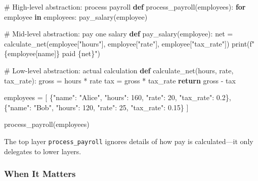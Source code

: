 \documentclass[
  letterpaper,
  DIV=11,
  numbers=noendperiod]{scrreprt}
\newenvironment{Shaded}{\begin{snugshade}}{\end{snugshade}}
\newcommand{\BuiltInTok}[1]{\textcolor[rgb]{0.00,0.23,0.31}{#1}}
\newcommand{\CommentTok}[1]{\textcolor[rgb]{0.37,0.37,0.37}{#1}}
\newcommand{\ControlFlowTok}[1]{\textcolor[rgb]{0.00,0.23,0.31}{\textbf{#1}}}
\newcommand{\DecValTok}[1]{\textcolor[rgb]{0.68,0.00,0.00}{#1}}
\newcommand{\FloatTok}[1]{\textcolor[rgb]{0.68,0.00,0.00}{#1}}
\newcommand{\KeywordTok}[1]{\textcolor[rgb]{0.00,0.23,0.31}{\textbf{#1}}}
\newcommand{\NormalTok}[1]{\textcolor[rgb]{0.00,0.23,0.31}{#1}}
\newcommand{\OperatorTok}[1]{\textcolor[rgb]{0.37,0.37,0.37}{#1}}
\newcommand{\SpecialCharTok}[1]{\textcolor[rgb]{0.37,0.37,0.37}{#1}}
\newcommand{\SpecialStringTok}[1]{\textcolor[rgb]{0.13,0.47,0.30}{#1}}
\newcommand{\StringTok}[1]{\textcolor[rgb]{0.13,0.47,0.30}{#1}}
\begin{document}
\begin{Shaded}
\begin{Highlighting}[]
\CommentTok{\# High{-}level abstraction: process payroll}
\KeywordTok{def}\NormalTok{ process\_payroll(employees):}
    \ControlFlowTok{for}\NormalTok{ employee }\KeywordTok{in}\NormalTok{ employees:}
\NormalTok{        pay\_salary(employee)}

\CommentTok{\# Mid{-}level abstraction: pay one salary}
\KeywordTok{def}\NormalTok{ pay\_salary(employee):}
\NormalTok{    net }\OperatorTok{=}\NormalTok{ calculate\_net(employee[}\StringTok{"hours"}\NormalTok{], employee[}\StringTok{"rate"}\NormalTok{], employee[}\StringTok{"tax\_rate"}\NormalTok{])}
    \BuiltInTok{print}\NormalTok{(}\SpecialStringTok{f"}\SpecialCharTok{\{}\NormalTok{employee[}\StringTok{\textquotesingle{}name\textquotesingle{}}\NormalTok{]}\SpecialCharTok{\}}\SpecialStringTok{ paid }\SpecialCharTok{\{}\NormalTok{net}\SpecialCharTok{\}}\SpecialStringTok{"}\NormalTok{)}

\CommentTok{\# Low{-}level abstraction: actual calculation}
\KeywordTok{def}\NormalTok{ calculate\_net(hours, rate, tax\_rate):}
\NormalTok{    gross }\OperatorTok{=}\NormalTok{ hours }\OperatorTok{*}\NormalTok{ rate}
\NormalTok{    tax }\OperatorTok{=}\NormalTok{ gross }\OperatorTok{*}\NormalTok{ tax\_rate}
    \ControlFlowTok{return}\NormalTok{ gross }\OperatorTok{{-}}\NormalTok{ tax}

\NormalTok{employees }\OperatorTok{=}\NormalTok{ [}
\NormalTok{    \{}\StringTok{"name"}\NormalTok{: }\StringTok{"Alice"}\NormalTok{, }\StringTok{"hours"}\NormalTok{: }\DecValTok{160}\NormalTok{, }\StringTok{"rate"}\NormalTok{: }\DecValTok{20}\NormalTok{, }\StringTok{"tax\_rate"}\NormalTok{: }\FloatTok{0.2}\NormalTok{\},}
\NormalTok{    \{}\StringTok{"name"}\NormalTok{: }\StringTok{"Bob"}\NormalTok{, }\StringTok{"hours"}\NormalTok{: }\DecValTok{120}\NormalTok{, }\StringTok{"rate"}\NormalTok{: }\DecValTok{25}\NormalTok{, }\StringTok{"tax\_rate"}\NormalTok{: }\FloatTok{0.15}\NormalTok{\}}
\NormalTok{]}

\NormalTok{process\_payroll(employees)}
\end{Highlighting}
\end{Shaded}

The top layer \texttt{process\_payroll} ignores details of how pay is
calculated---it only delegates to lower layers.

\subsubsection{When It Matters}\label{when-it-matters-42}
\end{document}
